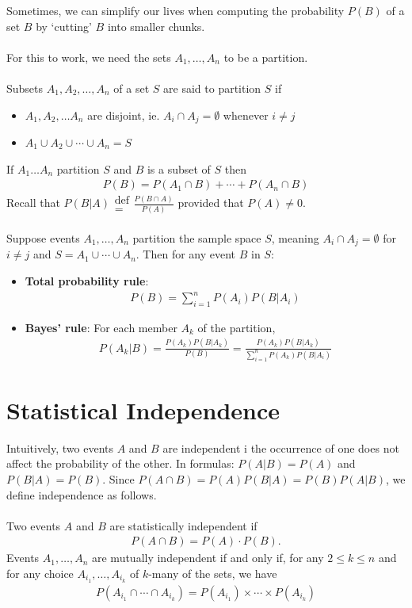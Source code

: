 \documentclass{report}
\begin{document}
\begin{enumerate}
		Sometimes, we can simplify our lives when computing the probability $P(B)$ of a set $B$ by `cutting' $B$ into smaller chunks.
		\\ \\
		For this to work, we need the sets $A_1, \dots, A_n$ to be a partition.
		\\ \\
		Subsets $A_1, A_2, \dots, A_n$ of a set $S$ are said to partition $S$ if
		\begin{itemize}
			\item $A_1, A_2, \dots A_n$ are disjoint, ie. $A_i \cap A_j = \emptyset$ whenever $i \neq j$
			\item $A_1 \cup A_2 \cup \cdots \cup A_n = S$
		\end{itemize}
		If $A_1 \dots A_n$ partition $S$ and $B$ is a subset of $S$ then
		\begin{align*}
			P(B) = P(A_1 \cap B) + \cdots + P(A_n \cap B)
		\end{align*}
		Recall that $P(B|A) \substack{\text{def}\\=} \frac{P(B \cap A)}{P(A)}$ provided that $P(A) \neq 0$.
		\\ \\
		Suppose events $A_1, \dots, A_n$ partition the sample space $S$, meaning $A_i \cap A_j = \emptyset$ for $i \neq j$ and $S = A_1 \cup \cdots \cup A_n$. Then for any event $B$ in $S$:
		\begin{itemize}
			\item \textbf{Total probability rule}:
				\begin{align*}
					P(B) = \sum_{i=1}^n P(A_i)P(B|A_i)
				\end{align*}
			\item \textbf{Bayes' rule}: For each member $A_k$ of the partition,
				\begin{align*}
					P(A_k|B) = \frac{P(A_k)P(B|A_k)}{P(B)} = \frac{P(A_k)P(B|A_k)}{\displaystyle\sum_{i=1}^n P(A_k)P(B|A_i)}
				\end{align*}
		\end{itemize}

	\section{Statistical Independence}

		Intuitively, two events $A$ and $B$ are independent i the occurrence of one does not affect the probability of the other. In formulas: $P(A|B) = P(A)$ and $P(B|A) = P(B)$. Since $P(A \cap B) = P(A)P(B|A) = P(B)P(A|B)$, we define independence as follows.
		\\ \\
		Two events $A$ and $B$ are statistically independent if
		\begin{align*}
			P(A \cap B) = P(A) \cdot P(B).
		\end{align*}
		Events $A_1, \dots, A_n$ are mutually independent if and only if, for any $2 \leq k \leq n$ and for any choice $A_i_1, \dots, A_i_k$ of $k$-many of the sets, we have
		\begin{align*}
			P(A_i_1 \cap \cdots \cap A_i_k) = P(A_i_1) \times \cdots \times P(A_i_k)
		\end{align*}


\end{enumerate}
\end{document}

